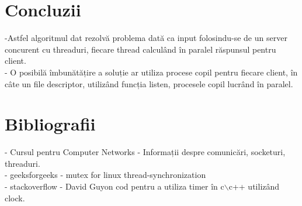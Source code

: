 \documentclass{llncs}
\begin{document}
\section{Concluzii}
-Astfel algoritmul dat rezolvă problema dată ca input folosindu-se de un server concurent cu threaduri, fiecare thread calculând în paralel răspunsul pentru client.\\
- O posibilă îmbunătățire a soluție ar utiliza procese copil pentru fiecare client, în câte un file descriptor, utilizând funcția listen, procesele copil lucrând în paralel.
\section{Bibliografii}
- Cursul pentru Computer Networks - Informații despre comunicări, socketuri, threaduri.\\
- geeksforgeeks - mutex for linux thread-synchronization\\
- stackoverflow - David Guyon cod pentru a utiliza timer în c$\backslash$c++ utilizând clock.
\end{document}
